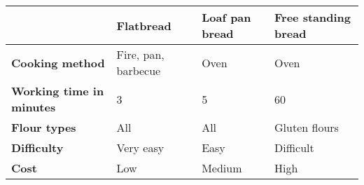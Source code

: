 


\begin{tabular}{|l|l|l|l|}
\hline
                                 & \textbf{Flatbread}  & \textbf{Loaf pan bread} & \textbf{Free standing bread} \\ \hline
\textbf{Cooking method}          & Fire, pan, barbecue & Oven                    & Oven                         \\ \hline
\textbf{Working time in minutes} & 3                   & 5                       & 60                           \\ \hline
\textbf{Flour types}             & All                 & All                     & Gluten flours                \\ \hline
\textbf{Difficulty}              & Very easy           & Easy                    & Difficult                    \\ \hline
\textbf{Cost}                    & Low                 & Medium                  & High                         \\ \hline
\end{tabular}

